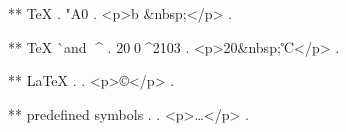 ** TeX \char
.
 \char"A0
.
<p>b &nbsp;</p>
.

** TeX ^^ and ^^^^
.
20^^A0^^^^2103
.
<p>20&nbsp;℃</p>
.


** LaTeX \symbol{}
.
.
<p>©</p>
.


** predefined symbols
.
\textellipsis
.
<p>…</p>
.